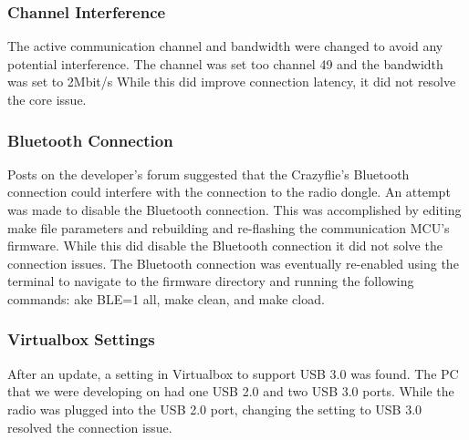 \documentclass[12pt]{article}
\begin{document}
\subsubsection{Channel Interference}
The active communication channel and bandwidth were changed to avoid any potential interference. The channel was set too channel 49 and the bandwidth was set to 2Mbit/s While this did improve connection latency, it did not resolve the core issue.
\subsubsection{Bluetooth Connection}
Posts on the developer’s forum suggested that the Crazyflie’s Bluetooth connection could interfere with the connection to the radio dongle. An attempt was made to disable the Bluetooth connection. This was accomplished by editing make file parameters and rebuilding and re-flashing the communication MCU’s firmware. While this did disable the Bluetooth connection it did not solve the connection issues. The Bluetooth connection was eventually re-enabled using the terminal to navigate to the firmware directory and running the following commands: ake BLE=1 all, make clean, and make cload.
\subsubsection{Virtualbox Settings}
After an update, a setting in Virtualbox to support USB 3.0 was found. The PC that we were developing on had one USB 2.0 and two USB 3.0 ports. While the radio was plugged into the USB 2.0 port, changing the setting to USB 3.0 resolved the connection issue.
\end{document}

